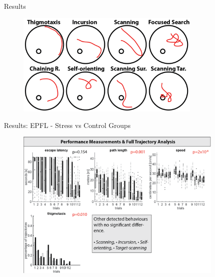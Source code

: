 \documentclass{beamer}
\begin{document}
{\begin{frame}{Results}
	\begin{figure}[H]
		\centering
		\includegraphics[width=0.8\textwidth]{figures/res1}
	\end{figure}
	\vspace{15mm}
\end{frame}

\begin{frame}{Results: EPFL - Stress vs Control Groups}
	\begin{figure}[H]
		\centering
		\includegraphics[width=0.9\textwidth]{figures/res2}
	\end{figure}
	\vspace{15mm}
\end{frame}

}
\end{document}
